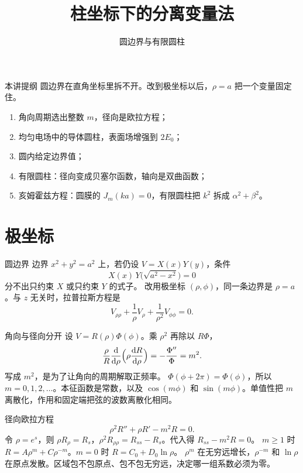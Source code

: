 \documentclass[fontset=windows, chinese, 10pt, xcolor=dvipsnames]{beamer}
\title{柱坐标下的分离变量法}
\subtitle{圆边界与有限圆柱}
\begin{document}
\begin{frame}
  \titlepage
\end{frame}

\begin{frame}{本讲提纲}
  圆边界在直角坐标里拆不开。改到极坐标以后，$\rho=a$ 把一个变量固定住。
  \begin{enumerate}
    \item 角向周期选出整数 $m$，径向是欧拉方程；
    \item 均匀电场中的导体圆柱，表面场增强到 $2E_0$；
    \item 圆内给定边界值；
    \item 有限圆柱：径向变成贝塞尔函数，轴向是双曲函数；
    \item 亥姆霍兹方程：圆膜的 $J_m(ka)=0$，有限圆柱把 $k^2$ 拆成 $\alpha^2+\beta^2$。
  \end{enumerate}
\end{frame}

\section{极坐标}

\begin{frame}{圆边界}
  边界 $x^2+y^2=a^2$ 上，若仍设 $V=X(x)Y(y)$，条件
  \[
    X(x)\,Y\bigl(\sqrt{a^2-x^2}\bigr)=0
  \]
  分不出只约束 $X$ 或只约束 $Y$ 的式子。
  \vspace{0.4em}
  改用极坐标 $(\rho,\phi)$，同一条边界是 $\rho=a$。与 $z$ 无关时，拉普拉斯方程是
  \[
    V_{\rho\rho}+\frac1\rho V_{\rho}+\frac{1}{\rho^2}V_{\phi\phi}=0.
  \]
\end{frame}

\begin{frame}{角向与径向分开}
  设 $V=R(\rho)\Phi(\phi)$。乘 $\rho^2$ 再除以 $R\Phi$，
  \[
    \frac{\rho}{R}\frac{\mathrm{d}}{\mathrm{d}\rho}
      \Bigl(\rho\frac{\mathrm{d}R}{\mathrm{d}\rho}\Bigr)
    =-\frac{\Phi''}{\Phi}=m^2.
  \]
  写成 $m^2$，是为了让角向的周期解取正频率。
  \vspace{0.3em}
  $\Phi(\phi+2\pi)=\Phi(\phi)$，所以 $m=0,1,2,\ldots$。本征函数是常数，以及 $\cos(m\phi)$ 和 $\sin(m\phi)$。单值性把 $m$ 离散化，作用和固定端把弦的波数离散化相同。
\end{frame}

\begin{frame}{径向欧拉方程}
  \[
    \rho^2 R''+\rho R'-m^2 R=0.
  \]
  令 $\rho=e^{s}$，则 $\rho R_{\rho}=R_s$，$\rho^2 R_{\rho\rho}=R_{ss}-R_s$。代入得 $R_{ss}-m^2 R=0$。
  \vspace{0.35em}
  $m\geq 1$ 时 $R=A\rho^{m}+C\rho^{-m}$。$m=0$ 时 $R=C_0+D_0\ln\rho$。
  \vspace{0.3em}
  $\rho^{m}$ 在无穷远增长，$\rho^{-m}$ 和 $\ln\rho$ 在原点发散。区域包不包原点、包不包无穷远，决定哪一组系数必须为零。
\end{frame}
\end{document}
